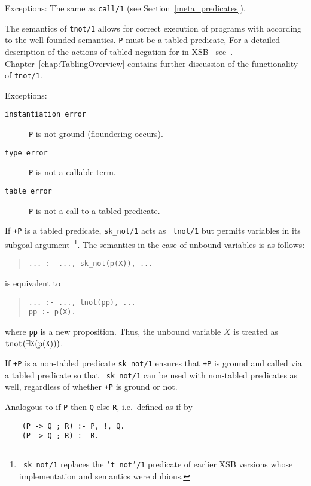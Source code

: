 \begin{description}
    Exceptions: The same as {\tt call/1} 
		(see Section~\ref{meta_predicates}).

\label{tnot/1}
    The semantics of {\tt tnot/1} allows for correct execution of
    programs with according to the well-founded semantics.  {\tt P}
    must be a tabled predicate, 
%
% 
%
    For a detailed description of the actions of tabled negation for
    in XSB \version\ see~\cite{SaSw98, SaSW96}.
    Chapter~\ref{chap:TablingOverview} contains further discussion of the
    functionality of {\tt tnot/1}.

    Exceptions:
    \begin{description}
    \item[{\tt instantiation\_error}]
	{\tt P} is not ground (floundering occurs).
    \item[{\tt type\_error}]
	{\tt P} is not a callable term.
    \item[{\tt table\_error}]
	{\tt P} is not a call to a tabled predicate.
    \end{description}


If {\tt +P} is a tabled predicate, {\tt sk\_not/1} acts as {\tt
  tnot/1} but permits variables in its subgoal argument~\footnote{{\tt
    sk\_not/1} replaces the {\tt 't not'/1} predicate of earlier XSB
  versions whose implementation and semantics were dubious.}. The
semantics in the case of unbound variables is as follows:
\begin{quote} 
\tt ... :- ...,~sk\_not(p(X)),~...  \end{quote} 
is equivalent to 
\begin{quote}
 \tt ... :- ..., tnot(pp),~...\\ pp :- p(X).
\end{quote} 
where {\tt pp} is a new proposition. Thus, the unbound variable $X$ is
treated as $\tt tnot(\exists X (p(X)))$.

If {\tt +P} is a non-tabled predicate {\tt sk\_not/1} ensures that
{\tt +P} is ground and called via a tabled predicate so that {\tt
  sk\_not/1} can be used with non-tabled predicates as well,
regardless of whether {\tt +P} is ground or not.

    Analogous to if {\tt P} then {\tt Q} else {\tt R}, i.e.\ defined as 
    if by
	\begin{center}
	\begin{minipage}{2.10in}
	\begin{verbatim}
	(P -> Q ; R) :- P, !, Q.
	(P -> Q ; R) :- R.
	\end{verbatim}
	\end{minipage}
	\end{center}


\end{description}
